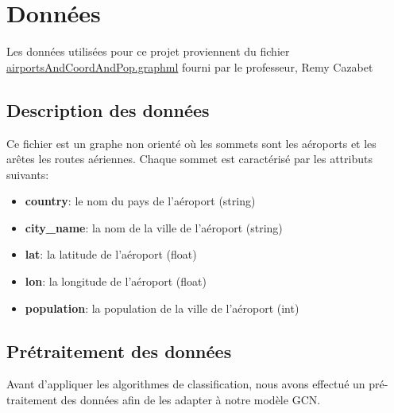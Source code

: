 \section{Données}
Les données utilisées pour ce projet proviennent du fichier \href{http://cazabetremy.fr/Teaching/IAbioInspire/airportsAndCoordAndPop.graphml}{airportsAndCoordAndPop.graphml} fourni par le professeur, Remy Cazabet

\subsection{Description des données}

Ce fichier est un graphe non orienté où les sommets sont les aéroports et les arêtes les routes aériennes. Chaque sommet est caractérisé par les attributs suivants:
\begin{itemize}
    \item \textbf{country}: le nom du pays de l'aéroport (string)
    \item \textbf{city\_name}: la nom de la ville de l'aéroport (string)
    \item \textbf{lat}: la latitude de l'aéroport (float)
    \item \textbf{lon}: la longitude de l'aéroport (float)
    \item \textbf{population}: la population de la ville de l'aéroport (int)
\end{itemize}

\subsection{Prétraitement des données}
Avant d'appliquer les algorithmes de classification, nous avons effectué un pré-traitement des données afin de les adapter à notre modèle GCN. 

